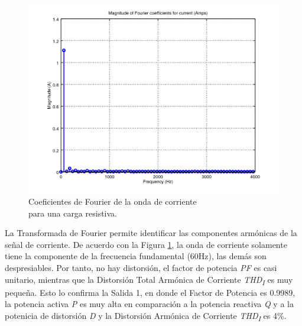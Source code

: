 \documentclass[journal]{IEEEtran}
\begin{document}
\begin{figure}[h]
\centering
\includegraphics[clip,width=\columnwidth]
{zoomed_current_furier_coefficients_resistive.png}
\caption{Coeficientes de Fourier de la onda de corriente \\
para una carga resistiva.}
\label{fourier_corrent_coefficients_resistive}
\end{figure}

La Transformada de Fourier permite identificar las 
componentes armónicas de la señal de corriente. 
De acuerdo con la Figura 
\ref{fourier_corrent_coefficients_resistive}, la onda 
de corriente solamente tiene la componente de la frecuencia 
fundamental (60Hz), las demás son despresiables. 
Por tanto, no hay distorsión, el factor de potencia 
\textit{PF} es casi unitario, mientras que la Distorsión 
Total Armónica de Corriente 
\textit{THD\textsubscript{I}} es muy pequeña. Esto lo 
confirma la Salida 1, en donde el Factor de Potencia es 
0.9989, la potencia activa \textit{P} es muy alta en 
comparación a la potencia reactiva \textit{Q} y a la 
potenicia de distorsión \textit{D} 
y la Distorsión Armónica de Corriente 
\textit{THD\textsubscript{I}} es 4\%. 

\end{document}
